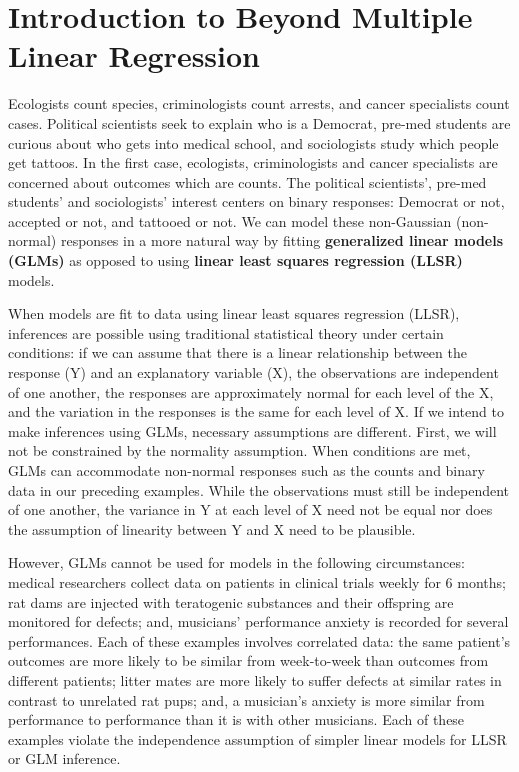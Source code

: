 \documentclass[
]{krantz}
\begin{document}
\hypertarget{introduction-to-beyond-multiple-linear-regression}{%
\section{Introduction to Beyond Multiple Linear Regression}\label{introduction-to-beyond-multiple-linear-regression}}

Ecologists count species, criminologists count arrests, and cancer specialists count cases. Political scientists seek to explain who is a Democrat, pre-med students are curious about who gets into medical school, and sociologists study which people get tattoos. In the first case, ecologists, criminologists and cancer specialists are concerned about outcomes which are counts. The political scientists', pre-med students' and sociologists' interest centers on binary responses: Democrat or not, accepted or not, and tattooed or not. We can model these non-Gaussian (non-normal) responses in a more natural way by fitting \textbf{generalized linear models (GLMs)} as opposed to using \textbf{linear least squares regression (LLSR)} models.

When models are fit to data using linear least squares regression (LLSR),  inferences are possible using traditional statistical theory under certain conditions: if we can assume that there is a linear relationship between the response (Y) and an explanatory variable (X), the observations are independent of one another, the responses are approximately normal for each level of the X, and the variation in the responses is the same for each level of X. If we intend to make inferences using GLMs, necessary assumptions are different. First, we will not be constrained by the normality assumption. When conditions are met, GLMs can accommodate non-normal responses such as the counts and binary data in our preceding examples. While the observations must still be independent of one another, the variance in Y at each level of X need not be equal nor does the assumption of linearity between Y and X need to be plausible.

However, GLMs cannot be used for models in the following circumstances: medical researchers collect data on patients in clinical trials weekly for 6 months; rat dams are injected with teratogenic substances and their offspring are monitored for defects; and, musicians' performance anxiety is recorded for several performances. Each of these examples involves correlated data: the same patient's outcomes are more likely to be similar from week-to-week than outcomes from different patients; litter mates are more likely to suffer defects at similar rates in contrast to unrelated rat pups; and, a musician's anxiety is more similar from performance to performance than it is with other musicians. Each of these examples violate the independence assumption of simpler linear models for LLSR or GLM inference.
\end{document}
